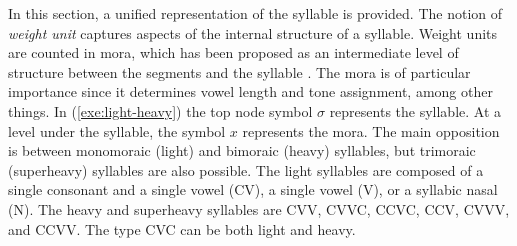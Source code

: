 In this section,  a unified representation of the syllable is provided. The
notion
of  {\it weight unit} captures aspects of the internal structure of a syllable.
Weight units are counted in mora, which has been proposed as an intermediate
level of structure between the segments and the syllable \citep{Hyma85}.   The
mora
is of particular importance since it determines vowel length and  tone
assignment, among other things.   In (\ref{exe:light-heavy}) the top node symbol
$\sigma$ represents the syllable. At a level under the syllable, the symbol $x$
represents the mora.  The main opposition is between monomoraic (light) and
bimoraic (heavy) syllables, but trimoraic (superheavy)  syllables are also
possible. The light syllables are composed of  a single consonant and a single
vowel (CV),  a single vowel (V), or  a syllabic nasal (N). The heavy and
superheavy syllables are  CVV,  CVVC, CCVC, CCV, CVVV, and  CCVV. The type CVC
can be both light and heavy.   

\pagebreak

